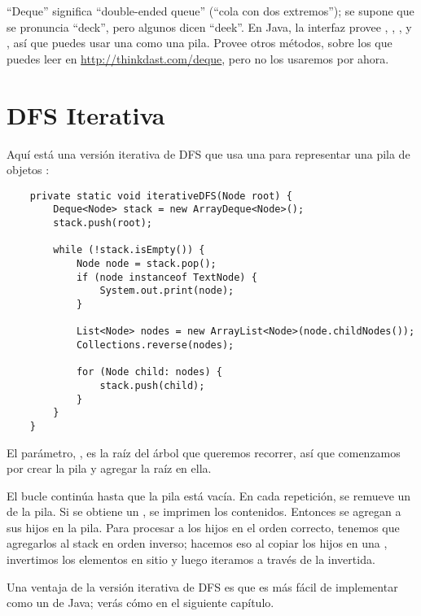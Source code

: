 \documentclass[12pt]{book}
\theoremstyle{exercise}
\begin{document}
``Deque'' significa ``double-ended queue'' (``cola con dos extremos''); se supone que
se pronuncia ``deck'', pero algunos dicen ``deek''. En Java, la
interfaz  provee , ,
, y , así que puedes usar una  como
una pila. Provee otros métodos, sobre los que puedes leer en
\url{http://thinkdast.com/deque},
pero no los usaremos por ahora.



\section{DFS Iterativa}
\label{iterative-dfs}

Aquí está una versión iterativa de DFS que usa una  para
representar una pila de objetos :

\begin{verbatim}
    private static void iterativeDFS(Node root) {
        Deque<Node> stack = new ArrayDeque<Node>();
        stack.push(root);

        while (!stack.isEmpty()) {
            Node node = stack.pop();
            if (node instanceof TextNode) {
                System.out.print(node);
            }

            List<Node> nodes = new ArrayList<Node>(node.childNodes());
            Collections.reverse(nodes);

            for (Node child: nodes) {
                stack.push(child);
            }
        }
    }
\end{verbatim}

El parámetro, , es la raíz del árbol que queremos
recorrer, así que comenzamos por crear la pila y agregar la raíz en ella.



El bucle continúa hasta que la pila está vacía. En cada repetición, se
remueve un  de la pila. Si se obtiene un , se imprimen
los contenidos. Entonces se agregan a sus hijos en la pila. Para
procesar a los hijos en el orden correcto, tenemos que agregarlos al stack
en orden inverso; hacemos eso al copiar los hijos en una 
, invertimos los elementos en sitio y luego iteramos
a través de la  invertida.

Una ventaja de la versión iterativa de DFS es que es más fácil de
implementar como un  de Java; verás cómo en el siguiente
capítulo.
\end{document}
